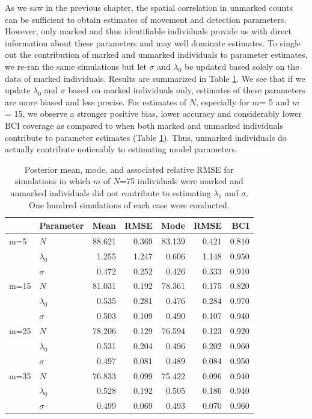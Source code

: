 As we saw in the previous chapter, the spatial correlation in unmarked
counts can be sufficient to obtain estimates of movement and detection
parameters. However, only marked and thus identifiable individuals
provide us with direct information about these parameters and may well
dominate estimates.  To single out the contribution of marked and
unmarked individuals to parameter estimates, we re-ran the same
simulations but let $\sigma$ and $\lambda_0$ be updated based solely
on the data of marked individuals. Results are summarized in
Table \ref{partialID.tab.sim2}.  We see that if we update $\lambda_0$
and $\sigma$ based on marked individuals only, estimates of these
parameters are more biased and less precise. For estimates of $N$,
especially for $m$= 5 and $m$ = 15, we observe a stronger positive
bias, lower accuracy and considerably lower BCI coverage as compared
to when both marked and unmarked individuals contribute to parameter
estimates (Table \ref{partialID.tab.sim2}). Thus, unmarked individuals
do actually contribute noticeably to estimating model parameters.

\begin{table}[ht]
\centering
\caption{Posterior mean, mode, and associated relative RMSE for simulations in
  which $m$ of $N$=75 individuals were marked and unmarked individuals
  did not contribute to estimating $\lambda_0$ and $\sigma$.
  One hundred simulations of each case were conducted. }
\begin{tabular}{llrrrrr}
\hline
     &	Parameter    &	Mean   &	RMSE  &	Mode   &	RMSE &	BCI    \\
     \hline
 m=5 &	$N$          &	88.621 &	0.369 &	83.139 &	0.421 &	0.810  \\
     &	$\lambda_0$  &	1.255  &	1.247 &	0.606  &	1.148 &	0.950  \\
     &	$\sigma$     &	0.472  &	0.252 &	0.426  &	0.333 &	0.910  \\
     \hline
 m=15&	$N$          &	81.031 &	0.192 &	78.361 &	0.175 &	0.820  \\
     &	$\lambda_0$  &	0.535  &	0.281 &	0.476  &	0.284 &	0.970  \\
     &	$\sigma$     &	0.503  &	0.109 &	0.490  &	0.107 &	0.940  \\
     \hline
 m=25&	$N$          &	78.206 &	0.129 &	76.594 &	0.123 &	0.920  \\
     &	$\lambda_0$  &	0.531  &	0.204 &	0.496  &	0.202 &	0.960  \\
     &	$\sigma$     &	0.497  &	0.081 &	0.489  &	0.084 &	0.950  \\
     \hline
 m=35&	$N$          &	76.833 &	0.099 &	75.422 &	0.096 &	0.940  \\
     &	$\lambda_0$  &	0.528  &	0.192 &	0.505  &	0.186 &	0.940  \\
     &	$\sigma$     &	0.499  &	0.069 &	0.493  &	0.070 &	0.960  \\
 \hline
\end{tabular}
\label{partialID.tab.sim2}
\end{table}


